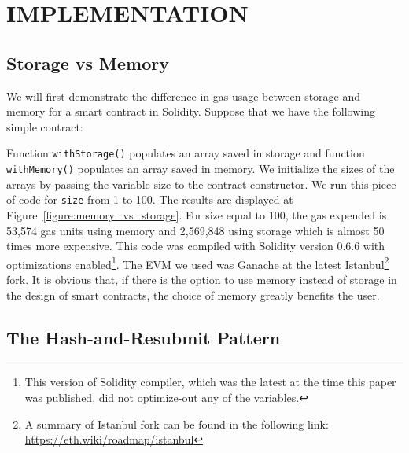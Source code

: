 \chapter{IMPLEMENTATION}



\section{Storage vs Memory}

We will first demonstrate the difference in gas usage between storage and
memory for a smart contract in Solidity. Suppose that we have the following
simple contract:



Function \texttt{withStorage()} populates an array saved in storage and
function \texttt{withMemory()} populates an array saved in memory. We
initialize the sizes of the arrays by passing the variable \textsf{size} to the
contract constructor. We run this piece of code for \texttt{size} from 1 to
100. The results are displayed at Figure~\ref{figure:memory_vs_storage}. For
\textsf{size} equal to 100, the gas expended is 53,574 gas units using memory
and 2,569,848 using storage which is almost 50 times more expensive. This code
was compiled with Solidity version 0.6.6 with optimizations
enabled\footnote{This version of Solidity compiler, which was the latest at the
time this paper was published, did not optimize-out any of the variables.}. The
EVM we used  was Ganache at the latest Istanbul\footnote{A summary of Istanbul
fork can be found in the following link:
\url{https://eth.wiki/roadmap/istanbul}} fork. It is obvious that, if there is
the option to use memory instead of storage in the design of smart contracts,
the choice of memory greatly benefits the user.



\section{The Hash-and-Resubmit Pattern}

